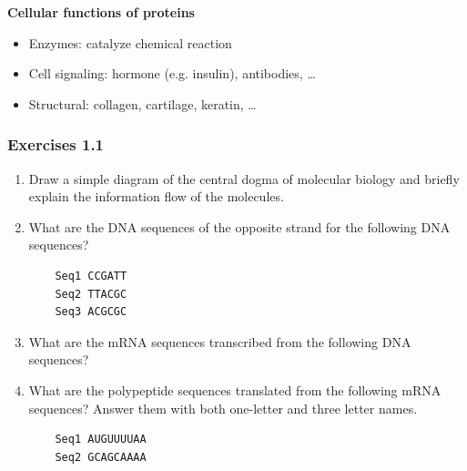 \noindent \textbf{Cellular functions of proteins}
\begin{itemize}
\item Enzymes: catalyze chemical reaction
\item Cell signaling: hormone (e.g. insulin), antibodies, …
\item Structural: collagen, cartilage, keratin, …
\end{itemize}

%
%
\subsubsection*{Exercises 1.1}
\begin{enumerate}

\item Draw a simple diagram of the central dogma of molecular biology and briefly explain the information flow of the molecules.

\item What are the DNA sequences of the opposite strand for the following DNA sequences?
\begin{verbatim}
    Seq1 CCGATT
    Seq2 TTACGC
    Seq3 ACGCGC
\end{verbatim}

\item What are the mRNA sequences transcribed from the following DNA sequences?

\item What are the polypeptide sequences translated from the following mRNA sequences? Answer them with both one-letter and three letter names.
\begin{verbatim}
    Seq1 AUGUUUUAA
    Seq2 GCAGCAAAA
\end{verbatim}
		
\end{enumerate}

%
